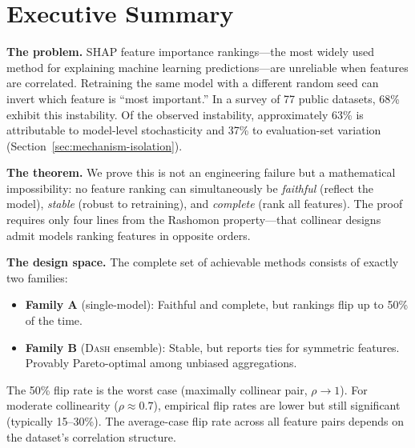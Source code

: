 \documentclass{article}
\newcommand{\DASH}{\textsc{Dash}}
\begin{document}
\begin{abstract}
The framework is mechanically verified in Lean~4 (357 theorems from 6 axioms, 0~\texttt{sorry}; 139 with multi-step proofs of ${\geq}5$ tactic lines)---the first formally verified impossibility in explainable AI. The formalization caught two logical inconsistencies and one type mismatch that survived informal review.

Code and Lean proofs: \url{https://github.com/DrakeCaraker/dash-impossibility-lean} (DOI: \url{https://doi.org/10.5281/zenodo.19468379}).
\end{abstract}

\section*{Executive Summary}

\noindent\textbf{The problem.} SHAP feature importance rankings---the most widely used method for explaining machine learning predictions---are unreliable when features are correlated. Retraining the same model with a different random seed can invert which feature is ``most important.'' In a survey of 77 public datasets, 68\% exhibit this instability. Of the observed instability, approximately 63\% is attributable to model-level stochasticity and 37\% to evaluation-set variation (Section~\ref{sec:mechanism-isolation}).

\noindent\textbf{The theorem.} We prove this is not an engineering failure but a mathematical impossibility: no feature ranking can simultaneously be \emph{faithful} (reflect the model), \emph{stable} (robust to retraining), and \emph{complete} (rank all features). The proof requires only four lines from the Rashomon property---that collinear designs admit models ranking features in opposite orders.

\noindent\textbf{The design space.} The complete set of achievable methods consists of exactly two families:
\begin{itemize}
    \item \textbf{Family A} (single-model): Faithful and complete, but rankings flip up to 50\% of the time.
    \item \textbf{Family B} (\DASH{} ensemble): Stable, but reports ties for symmetric features. Provably Pareto-optimal among unbiased aggregations.
\end{itemize}

The 50\% flip rate is the worst case (maximally collinear pair, $\rho \to 1$). For moderate collinearity ($\rho \approx 0.7$), empirical flip rates are lower but still significant (typically 15--30\%). The average-case flip rate across all feature pairs depends on the dataset's correlation structure.
\end{document}
